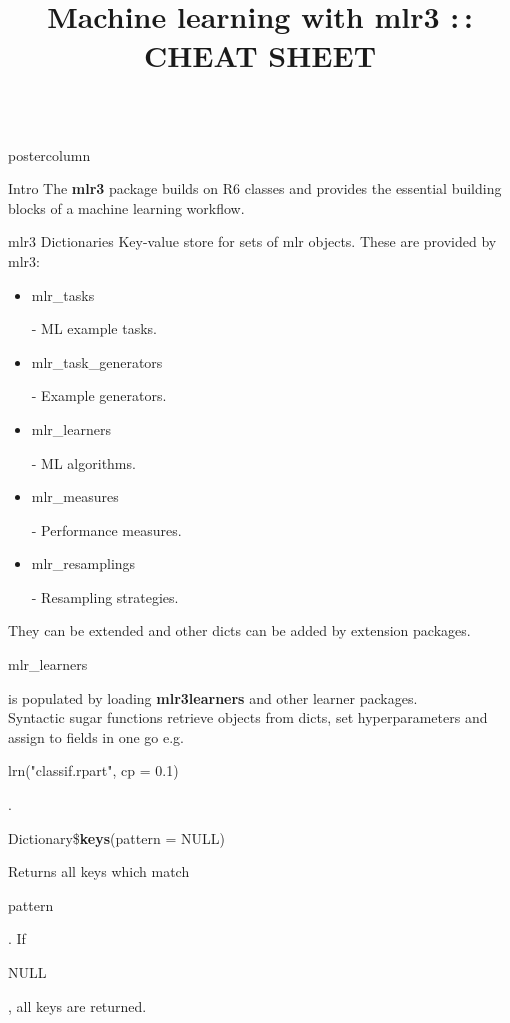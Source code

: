\documentclass{beamer}
\title{Machine learning with mlr3 :\,: CHEAT SHEET} %
\newlength{\columnheight} %
\newcommand{\codeinline}[1]{\begin{codeboxinline}#1\end{codeboxinline}}
\begin{document}
\begin{frame}[fragile]{}
	\begin{columns}
		\begin{column}{.245\textwidth}
			\begin{beamercolorbox}[center]{postercolumn}
				\begin{minipage}{.98\textwidth}
					\parbox[t][\columnheight]{\textwidth}{
						\begin{myblock}{Intro}
							The \textbf{mlr3} package builds on R6 classes and provides the essential building
							blocks of a machine learning workflow.
						\end{myblock}
						\begin{myblock}{mlr3 Dictionaries}
                            Key-value store for sets of mlr objects. These are provided by mlr3: 
							\begin{itemize}
								\item \codeinline{mlr\_tasks} - ML example tasks.
								\item \codeinline{mlr\_task\_generators} - Example generators.
                                \item \codeinline{mlr\_learners} - ML algorithms. 
								\item \codeinline{mlr\_measures} - Performance measures.
								\item \codeinline{mlr\_resamplings} - Resampling strategies.
							\end{itemize}
							\vspace{0.5em}
                            They can be extended and other dicts can be added by extension packages.
                            \codeinline{mlr\_learners} is populated by loading \textbf{mlr3learners} and other learner packages.
                            \vspace{1em}
                            \\
                            Syntactic sugar functions retrieve objects from dicts, set hyperparameters and assign to fields in one go e.g.
                            \codeinline{lrn("classif.rpart", cp = 0.1)}.
							\\
							\begin{codebox}
								Dictionary\$\textbf{keys}(pattern = NULL)
							\end{codebox}
							Returns all keys which match \codeinline{pattern}. 
							If \codeinline{NULL}, all keys are returned. 
							\\
							\begin{codebox}

\end{codebox}
\end{myblock}}
\end{minipage}
\end{beamercolorbox}
\end{column}
\end{columns}
\end{frame}
\end{document}
